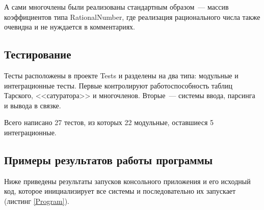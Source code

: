 А сами многочлены были реализованы стандартным образом~--- массив коэффициентов типа RationalNumber, где реализация рационального числа также очевидна и не нуждается в комментариях.

\subsection{Тестирование}

Тесты расположены в проекте Tests и разделены на два типа: модульные и интеграционные тесты. Первые контролируют работоспособность таблиц Тарского, <<сатуратора>> и многочленов. Вторые~--- системы ввода, парсинга и вывода в связке.

Всего написано 27 тестов, из которых 22 модульные, оставшиеся 5 интеграционные.

\subsection{Примеры результатов работы программы}

Ниже приведены результаты запусков консольного приложения и его исходный код, которое инициализирует все системы и последовательно их запускает (листинг \ref{Program}).



\begin{figure}[ht]
    \begin{minipage}[ht]{0.4\linewidth}
    \end{minipage}
    \hfill
    \begin{minipage}[ht]{0.4\linewidth}
    \end{minipage}
    \\
    \begin{minipage}[ht]{0.4\linewidth}
    \end{minipage}
    \hfill
    \begin{minipage}[ht]{0.4\linewidth}
    \end{minipage} 
    \label{fig:примеры}
\end{figure}

